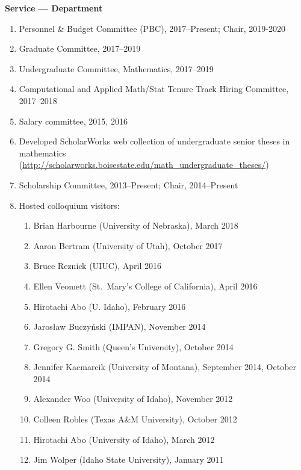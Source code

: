 \documentclass[12pt]{article}
\begin{document}
\textbf{Service --- Department}
\begin{enumerate}

\item Personnel \& Budget Committee (PBC), 2017--Present; Chair, 2019-2020

\item Graduate Committee, 2017--2019

\item Undergraduate Committee, Mathematics, 2017--2019

\item Computational and Applied Math/Stat Tenure Track Hiring Committee, 2017--2018

\item Salary committee, 2015, 2016

\item Developed ScholarWorks web collection of undergraduate senior theses in mathematics
(\url{http://scholarworks.boisestate.edu/math_undergraduate_theses/})


\item Scholarship Committee, 2013--Present; Chair, 2014--Present

\item Hosted colloquium visitors:
\begin{enumerate}
\item Brian Harbourne (University of Nebraska), March 2018
\item Aaron Bertram (University of Utah), October 2017
\item Bruce Reznick (UIUC), April 2016
\item Ellen Veomett (St.\ Mary's College of California), April 2016
\item Hirotachi Abo (U. Idaho), February 2016
\item Jaros{\l}aw Buczy\'nski (IMPAN), November 2014
\item Gregory G. Smith (Queen's University), October 2014
\item Jennifer Kacmarcik (University of Montana), September 2014, October 2014 %
\item Alexander Woo (University of Idaho), November 2012
\item Colleen Robles (Texas A\&M University), October 2012
\item Hirotachi Abo (University of Idaho), March 2012
\item Jim Wolper (Idaho State University), January 2011
\end{enumerate}


\end{enumerate}
\end{document}
